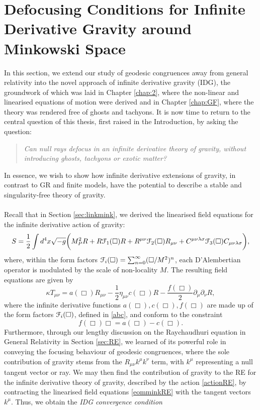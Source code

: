 \section{Defocusing Conditions for Infinite Derivative Gravity around Minkowski Space}
\label{sec:defocusmink}
In this section, we extend our study of geodesic congruences away from general relativity  into the novel approach of infinite derivative gravity (IDG), the groundwork of which was laid in Chapter \ref{chap:2}, where the non-linear and linearised equations of motion were derived and in Chapter \ref{chap:GF}, where the theory was rendered free of ghosts and tachyons. It is now time to return to the central question of this thesis, first raised in the Introduction, by asking the question:
\begin{quote}
\emph{Can null rays defocus in an infinite derivative theory of gravity, without introducing ghosts, tachyons or exotic matter?}
\end{quote}
In essence, we wish to show how infinite derivative extensions of gravity, in contrast to GR and finite  models, have the potential to describe a stable and singularity-free theory of gravity. 
\\\\
Recall that in Section \ref{sec:linkmink}, we derived the linearised field equations for the infinite derivative action of gravity:
\[
\label{actionRE}
S=\frac{1}{2}\int d^4x \sqrt{-g}\biggl(M_P^2 R+R{\cal F}_1(\Box)R+R^{\mu\nu}{\cal F}_2(\Box)R_{\mu\nu}+C^{\mu\nu\lambda\sigma}{\cal F}_3(\Box)C_{\mu\nu\lambda\sigma}\biggr)
,\]
where, within the form factors ${\cal F}_i(\Box)=\sum^\infty_{n=0}(\Box/M^2)^n$, each D'Alembertian operator is modulated by the scale of non-locality $M$. The resulting field equations are given by
\[
\label{eomminkRE}
\kappa T_{\mu\nu}=a(\Box)R_{\mu\nu}-\frac{1}{2}\eta_{\mu\nu} c(\Box)R-\frac{f(\Box)}{2}\partial_\mu \partial_\nu R
,\]
where the infinite derivative functions $a(\Box),c(\Box),f(\Box)$ are made up of the form factors ${\cal F}_i(\Box)$, defined in \eqref{abc}, and conform to the constraint
\[
f(\Box)\Box=a(\Box)-c(\Box)
.\]
Furthermore, through our lengthy discussion on the Raychaudhuri equation in General Relativity in Section \ref{sec:RE}, we learned of its powerful role in conveying the focusing behaviour of geodesic congruences, where the sole contribution of gravity stems from the $R_{\mu\nu}k^\mu k^\nu$ term, with $k^\mu$ representing a null tangent vector or ray. We may then find the contribution of gravity to the RE for the infinite derivative theory of gravity, described by the action \eqref{actionRE}, by contracting the linearised field equations \eqref{eomminkRE} with the tangent vectors $k^\mu$. Thus, we obtain the \emph{IDG convergence condition}
